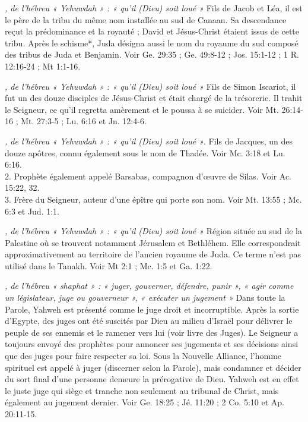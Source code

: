 \begin{multicols}{2}
\textit{, de l'hébreu « Yehuwdah » : « qu'il (Dieu) soit loué »}\newline
Fils de Jacob et Léa, il est le père de la tribu du même nom installée au sud de Canaan. Sa descendance reçut la prédominance et la royauté ; David et Jésus-Christ étaient issus de cette tribu. Après le schisme*, Juda désigna aussi le nom du royaume du sud composé des tribus de Juda et Benjamin. Voir Ge. 29:35 ; Ge. 49:8-12 ; Jos. 15:1-12 ; 1 R. 12:16-24 ; Mt 1:1-16.

\textit{, de l'hébreu « Yehuwdah » : « qu'il (Dieu) soit loué »}\newline
Fils de Simon Iscariot, il fut un des douze disciples de Jésus-Christ et était chargé de la trésorerie. Il trahit le Seigneur, ce qu'il regretta amèrement et le poussa à se suicider. Voir Mt. 26:14-16 ; Mt. 27:3-5 ; Lu. 6:16 et Jn. 12:4-6.

\textit{, de l'hébreu « Yehuwdah » : « qu'il (Dieu) soit loué »}. Fils de Jacques, un des douze apôtres, connu également sous le nom de Thadée. Voir Mc. 3:18 et Lu. 6:16.
\\2. Prophète également appelé Barsabas, compagnon d'œuvre de Silas. Voir Ac. 15:22, 32.
\\3. Frère du Seigneur, auteur d'une épître qui porte son nom. Voir Mt. 13:55 ; Mc. 6:3 et Jud. 1:1.

\textit{, de l'hébreu « Yehuwdah » : « qu'il (Dieu) soit loué »}\newline
Région située au sud de la Palestine où se trouvent notamment Jérusalem et Bethléhem. Elle correspondrait approximativement au territoire de l'ancien royaume de Juda. Ce terme n'est pas utilisé dans le Tanakh. Voir Mt 2:1 ; Mc. 1:5 et Ga. 1:22.

\textit{, de l'hébreu « shaphat » : « juger, gouverner, défendre, punir », « agir comme un législateur, juge ou gouverneur », « exécuter un jugement »}\newline
Dans toute la Parole, Yahweh est présenté comme le juge droit et incorruptible. Après la sortie d'Egypte, des juges ont été suscités par Dieu au milieu d'Israël pour délivrer le peuple de ses ennemis et le ramener vers lui (voir livre des Juges). Le Seigneur a toujours envoyé des prophètes pour annoncer ses jugements et ses décisions ainsi que des juges pour faire respecter sa loi. Sous la Nouvelle Alliance, l'homme spirituel est appelé à juger (discerner selon la Parole), mais condamner et décider du sort final d'une personne demeure la prérogative de Dieu. Yahweh est en effet le juste juge qui siège et tranche non seulement au tribunal de Christ, mais également au jugement dernier. Voir Ge. 18:25 ; Jé. 11:20 ; 2 Co. 5:10 et Ap. 20:11-15.


\end{multicols}
